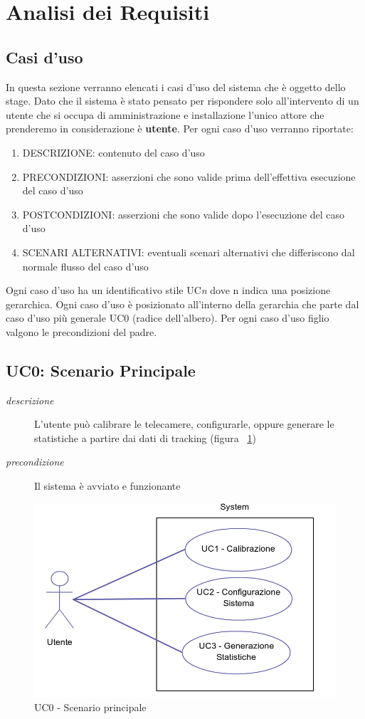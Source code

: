 
\section{Analisi dei Requisiti} \label{sec:analisi}
\subsection{Casi d'uso} %
In questa sezione verranno elencati i casi d'uso del sistema che è oggetto dello stage. Dato che il sistema è stato pensato per rispondere solo all'intervento di un utente che si occupa di amministrazione e installazione l'unico attore che prenderemo in considerazione è \textbf{utente}. Per ogni caso d'uso verranno riportate:
\begin{enumerate}
\item DESCRIZIONE: contenuto del caso d'uso
\item PRECONDIZIONI: asserzioni che sono valide prima dell'effettiva esecuzione del caso d'uso
\item POSTCONDIZIONI: asserzioni che sono valide dopo l'esecuzione del caso d'uso
\item SCENARI ALTERNATIVI: eventuali scenari alternativi che differiscono dal normale flusso del caso d'uso
\end{enumerate}
Ogni caso d'uso ha un identificativo stile UC\textit{n} dove n indica una posizione gerarchica.
Ogni caso d'uso è posizionato all'interno della gerarchia che parte dal caso d'uso più generale UC0 (radice dell'albero). Per ogni caso d'uso figlio valgono le precondizioni del padre.

\subsection{UC0: Scenario Principale}
\begin{description}
 \item[\em{descrizione}] L'utente può calibrare le telecamere, configurarle, oppure generare le statistiche a partire dai dati di tracking (figura ~\ref{fig:uc0})
 \item[\em{precondizione}] Il sistema è avviato e funzionante \end{description}
\begin{figure}[htpb]
\centering
\includegraphics[scale=0.4]{./images/uc0.png}
\caption{UC0 - Scenario principale}
\label{fig:uc0}
\end{figure} 
 

